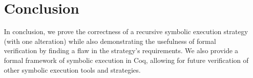 \section{Conclusion}
In conclusion, we prove the correctness of a recursive symbolic execution strategy (with one alteration) while also demonstrating the usefulness of formal verification by finding a flaw in the strategy's requirements.
We also provide a formal framework of symbolic execution in Coq, allowing for future verification of other symbolic execution tools and strategies.